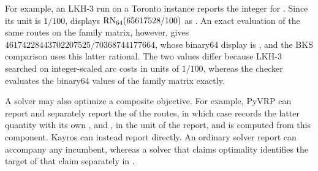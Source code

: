For example, an LKH-3 run on a Toronto instance reports the integer  for . Since its unit is $1/100$,  displays $\operatorname{RN}_{64}(65617528/100)$ as . An exact evaluation of the same routes on the family matrix, however, gives $46174228443702207525/70368744177664$, whose binary64 display is , and the BKS comparison uses this latter rational. The two values differ because LKH-3 searched on integer-scaled arc costs in units of $1/100$, whereas the checker evaluates the binary64 values of the family matrix exactly.

A solver may also optimize a composite objective. For example, PyVRP can report  and separately report the  of the routes, in which case  records the latter quantity with its own ,  and , in the unit of the report, and  is computed from this component. Kayros can instead report  directly. An ordinary solver report can accompany any incumbent, whereas a solver that claims optimality identifies the target of that claim separately in .
